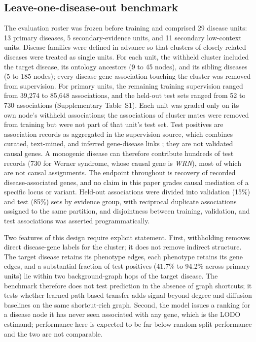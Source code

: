 \documentclass[11pt]{article}
\begin{document}
\subsection{Leave-one-disease-out benchmark}

The evaluation roster was frozen before training and comprised 29 disease units: 13 primary diseases, 5 secondary-evidence units, and 11 secondary low-context units. Disease families were defined in advance so that clusters of closely related diseases were treated as single units. For each unit, the withheld cluster included the target disease, its ontology ancestors (9 to 45 nodes), and its sibling diseases (5 to 185 nodes); every disease-gene association touching the cluster was removed from supervision. For primary units, the remaining training supervision ranged from 39,274 to 85,648 associations, and the held-out test sets ranged from 52 to 730 associations (Supplementary Table~S1). Each unit was graded only on its own node's withheld associations; the associations of cluster mates were removed from training but were not part of that unit's test set. Test positives are association records as aggregated in the supervision source, which combines curated, text-mined, and inferred gene-disease links \cite{pineiro2020}; they are not validated causal genes. A monogenic disease can therefore contribute hundreds of test records (730 for Werner syndrome, whose causal gene is \textit{WRN}), most of which are not causal assignments. The endpoint throughout is recovery of recorded disease-associated genes, and no claim in this paper grades causal mediation of a specific locus or variant. Held-out associations were divided into validation (15\%) and test (85\%) sets by evidence group, with reciprocal duplicate associations assigned to the same partition, and disjointness between training, validation, and test associations was asserted programmatically.

Two features of this design require explicit statement. First, withholding removes direct disease-gene labels for the cluster; it does not remove indirect structure. The target disease retains its phenotype edges, each phenotype retains its gene edges, and a substantial fraction of test positives (41.7\% to 94.2\% across primary units) lie within two background-graph hops of the target disease. The benchmark therefore does not test prediction in the absence of graph shortcuts; it tests whether learned path-based transfer adds signal beyond degree and diffusion baselines on the same shortcut-rich graph. Second, the model issues a ranking for a disease node it has never seen associated with any gene, which is the LODO estimand; performance here is expected to be far below random-split performance and the two are not comparable.
\end{document}
